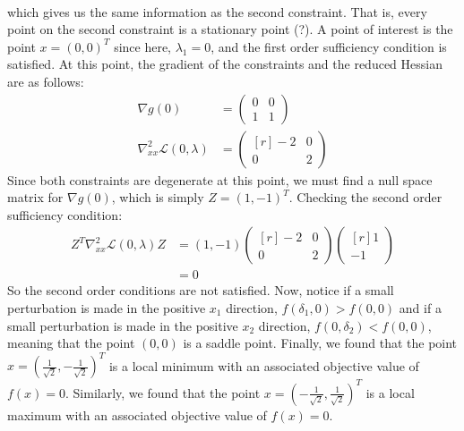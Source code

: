 \documentclass{article}
\begin{document}
\begin{itemize}
\begin{itemize}
\begin{align*}
        \end{align*}
        which gives us the same information as the second constraint. That is, every point on the second constraint is a stationary point (?). A point of interest is the point $x = (0,0)^T$ since here, $\lambda_1 = 0$, and the first order sufficiency condition is satisfied. At this point, the gradient of the constraints and the reduced Hessian are as follows:
        \begin{align*}
            \nabla g(0) &= \begin{pmatrix}
                0 & 0\\
                1 & 1
            \end{pmatrix} \\
            \nabla_{xx}^2\mathscr{L}(0,\lambda) &= \begin{pmatrix*}[r]
                -2 & 0\\
                0 & 2
            \end{pmatrix*}
        \end{align*}
        Since both constraints are degenerate at this point, we must find a null space matrix for $\nabla g(0)$, which is simply $Z = (1,-1)^T$. Checking the second order sufficiency condition:
        \begin{align*}
            Z^T\nabla_{xx}^2\mathscr{L}(0,\lambda)Z &= (1,-1)\begin{pmatrix*}[r]
                -2 & 0\\
                0 & 2
            \end{pmatrix*}\begin{pmatrix*}[r]
                1\\
                -1
            \end{pmatrix*}\\
            &= 0
        \end{align*}
        So the second order conditions are not satisfied. Now, notice if a small perturbation is made in the positive $x_1$ direction, $f(\delta_1,0)  > f(0,0)$ and if a small perturbation is made in the positive $x_2$ direction, $f(0,\delta_2) < f(0,0)$, meaning that the point $(0,0)$ is a saddle point.
        \newline\newline
        Finally, we found that the point $x = (\frac{1}{\sqrt{2}}, -\frac{1}{\sqrt{2}})^T$ is a local minimum with an associated objective value of $f(x) = 0$. 
        Similarly, we found that the point $x = (-\frac{1}{\sqrt{2}}, \frac{1}{\sqrt{2}})^T$ is a local maximum with an associated objective value of $f(x) = 0$. 
        

\end{itemize}
\end{itemize}
\end{document}
